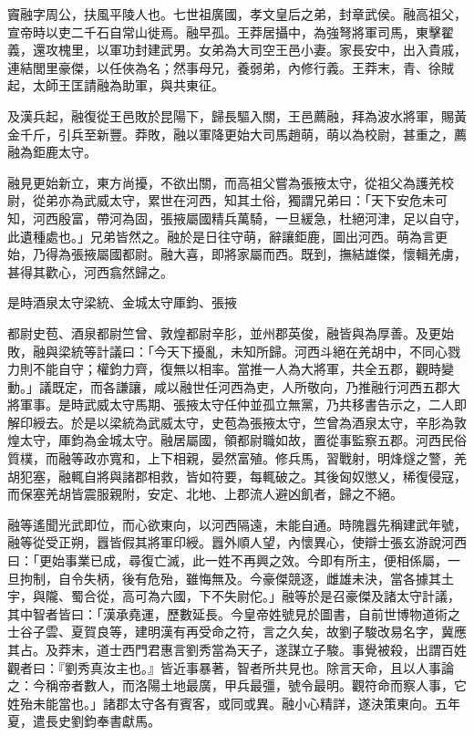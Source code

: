 
\begin{pinyinscope}
竇融字周公，扶風平陵人也。七世祖廣國，孝文皇后之弟，封章武侯。融高祖父，宣帝時以吏二千石自常山徙焉。融早孤。王莽居攝中，為強弩將軍司馬，東擊翟義，還攻槐里，以軍功封建武男。女弟為大司空王邑小妻。家長安中，出入貴戚，連結閭里豪傑，以任俠為名；然事母兄，養弱弟，內修行義。王莽末，青、徐賊起，太師王匡請融為助軍，與共東征。

及漢兵起，融復從王邑敗於昆陽下，歸長驅入關，王邑薦融，拜為波水將軍，賜黃金千斤，引兵至新豐。莽敗，融以軍降更始大司馬趙萌，萌以為校尉，甚重之，薦融為鉅鹿太守。

融見更始新立，東方尚擾，不欲出關，而高祖父嘗為張掖太守，從祖父為護羌校尉，從弟亦為武威太守，累世在河西，知其土俗，獨謂兄弟曰：「天下安危未可知，河西殷富，帶河為固，張掖屬國精兵萬騎，一旦緩急，杜絕河津，足以自守，此遺種處也。」兄弟皆然之。融於是日往守萌，辭讓鉅鹿，圖出河西。萌為言更始，乃得為張掖屬國都尉。融大喜，即將家屬而西。既到，撫結雄傑，懷輯羌虜，甚得其歡心，河西翕然歸之。

是時酒泉太守梁統、金城太守厙鈞、張掖

都尉史苞、酒泉都尉竺曾、敦煌都尉辛肜，並州郡英俊，融皆與為厚善。及更始敗，融與梁統等計議曰：「今天下擾亂，未知所歸。河西斗絕在羌胡中，不同心戮力則不能自守；權鈞力齊，復無以相率。當推一人為大將軍，共全五郡，觀時變動。」議既定，而各謙讓，咸以融世任河西為吏，人所敬向，乃推融行河西五郡大將軍事。是時武威太守馬期、張掖太守任仲並孤立無黨，乃共移書告示之，二人即解印綬去。於是以梁統為武威太守，史苞為張掖太守，竺曾為酒泉太守，辛肜為敦煌太守，厙鈞為金城太守。融居屬國，領都尉職如故，置從事監察五郡。河西民俗質樸，而融等政亦寬和，上下相親，晏然富殖。修兵馬，習戰射，明烽燧之警，羌胡犯塞，融輒自將與諸郡相救，皆如符要，每輒破之。其後匈奴懲乂，稀復侵寇，而保塞羌胡皆震服親附，安定、北地、上郡流人避凶飢者，歸之不絕。

融等遙聞光武即位，而心欲東向，以河西隔遠，未能自通。時隗囂先稱建武年號，融等從受正朔，囂皆假其將軍印綬。囂外順人望，內懷異心，使辯士張玄游說河西曰：「更始事業已成，尋復亡滅，此一姓不再興之效。今即有所主，便相係屬，一旦拘制，自令失柄，後有危殆，雖悔無及。今豪傑競逐，雌雄未決，當各據其土宇，與隴、蜀合從，高可為六國，下不失尉佗。」融等於是召豪傑及諸太守計議，其中智者皆曰：「漢承堯運，歷數延長。今皇帝姓號見於圖書，自前世博物道術之士谷子雲、夏賀良等，建明漢有再受命之符，言之久矣，故劉子駿改易名字，冀應其占。及莽末，道士西門君惠言劉秀當為天子，遂謀立子駿。事覺被殺，出謂百姓觀者曰：『劉秀真汝主也。』皆近事暴著，智者所共見也。除言天命，且以人事論之：今稱帝者數人，而洛陽土地最廣，甲兵最彊，號令最明。觀符命而察人事，它姓殆未能當也。」諸郡太守各有賓客，或同或異。融小心精詳，遂決策東向。五年夏，遣長史劉鈞奉書獻馬。


\end{pinyinscope}
